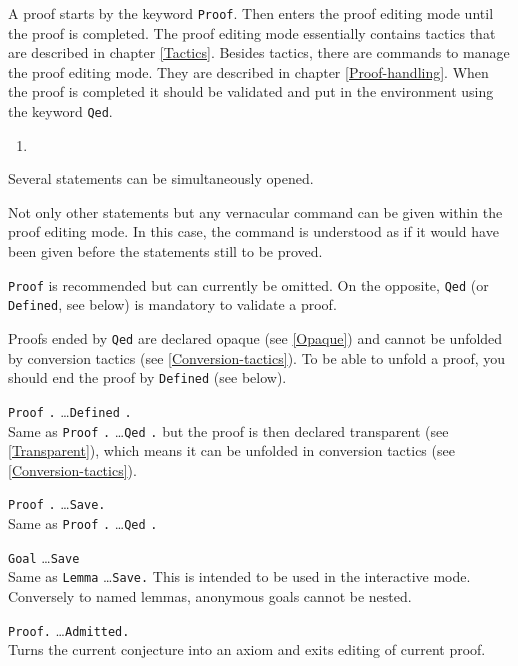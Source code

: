 A proof starts by the keyword {\tt Proof}.  Then {\Coq} enters the
proof editing mode until the proof is completed. The proof editing
mode essentially contains tactics that are described in chapter
\ref{Tactics}. Besides tactics, there are commands to manage the proof
editing mode. They are described in chapter \ref{Proof-handling}. When
the proof is completed it should be validated and put in the
environment using the keyword {\tt Qed}.
\medskip

\ErrMsg
\begin{enumerate}
\item {}
\end{enumerate}

\begin{Remarks}
\item Several statements can be simultaneously opened.
\item Not only other statements but any vernacular command can be given
within the proof editing mode. In this case, the command is
understood as if it would have been given before the statements still to be
proved. 
\item {\tt Proof} is recommended but can currently be omitted. On the
opposite, {\tt Qed} (or {\tt Defined}, see below) is mandatory to validate a proof.
\item Proofs ended by {\tt Qed} are declared opaque (see \ref{Opaque})
and cannot be unfolded by conversion tactics (see \ref{Conversion-tactics}).
To be able to unfold a proof, you should end the proof by {\tt Defined}
 (see below). 
\end{Remarks}

\begin{Variants}
\item {\tt Proof} {\tt .} \dots {\tt Defined} {\tt .}\\
  Same as {\tt Proof} {\tt .} \dots {\tt Qed} {\tt .} but the proof is
  then declared transparent (see \ref{Transparent}), which means it
  can be unfolded in conversion tactics (see \ref{Conversion-tactics}).
\item {\tt Proof} {\tt .} \dots {\tt Save.}\\
  Same as {\tt Proof} {\tt .} \dots {\tt Qed} {\tt .}
\item {\tt Goal} \type \dots {\tt Save} \ident \\
  Same as {\tt Lemma} \ident {\tt :} \type \dots {\tt Save.}
  This is intended to be used in the interactive mode. Conversely to named
  lemmas, anonymous goals cannot be nested.
\item {\tt Proof.} \dots {\tt Admitted.}\\
  Turns the current conjecture into an axiom and exits editing of
  current proof.
\end{Variants}


